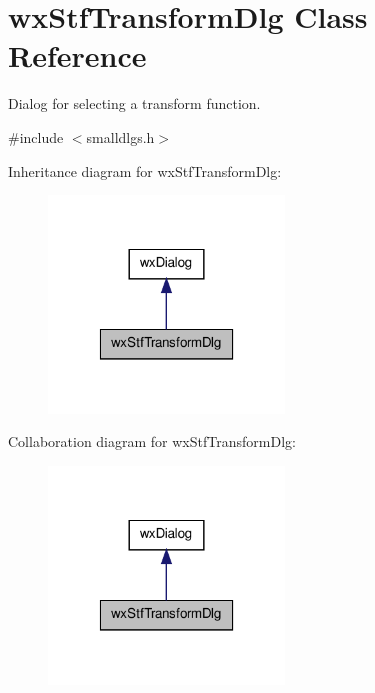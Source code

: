 \hypertarget{classwxStfTransformDlg}{
\section{wxStfTransformDlg Class Reference}
\label{classwxStfTransformDlg}
}


Dialog for selecting a transform function.  




{\ttfamily \#include $<$smalldlgs.h$>$}



Inheritance diagram for wxStfTransformDlg:
\nopagebreak
\begin{figure}[H]
\begin{center}
\leavevmode
\includegraphics[width=178pt]{classwxStfTransformDlg__inherit__graph}
\end{center}
\end{figure}


Collaboration diagram for wxStfTransformDlg:
\nopagebreak
\begin{figure}[H]
\begin{center}
\leavevmode
\includegraphics[width=178pt]{classwxStfTransformDlg__coll__graph}
\end{center}
\end{figure}
